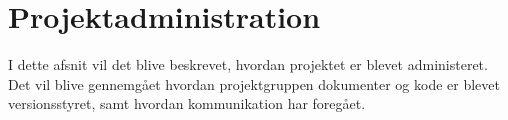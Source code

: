 \chapter{Projektadministration}

I dette afsnit vil det blive beskrevet, hvordan projektet er blevet administeret. Det vil blive gennemgået hvordan projektgruppen dokumenter og kode er blevet versionsstyret, samt hvordan kommunikation har foregået.